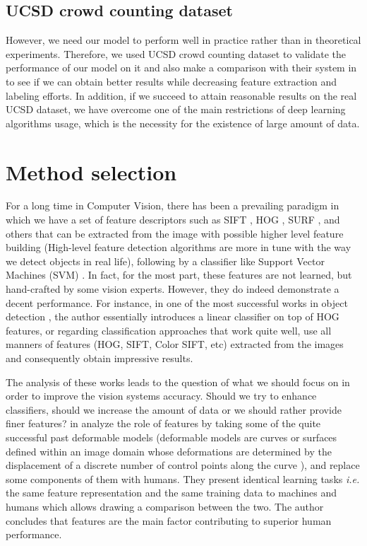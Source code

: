 \subsection{UCSD crowd counting dataset}

However, we need our model to perform well in practice rather than in theoretical experiments. Therefore, we used UCSD crowd counting dataset \cite{chan2008privacy} to validate the performance of our model on it and also make a comparison with their system in \cite{chan2008privacy} to see if we can obtain better results while decreasing feature extraction and labeling efforts. In addition, if we succeed to attain reasonable results on the real UCSD dataset, we have overcome one of the main restrictions of deep learning algorithms usage, which is the necessity for the existence of large amount of data.     


\section{Method selection}

For a long time in Computer Vision, there has been a prevailing paradigm in which we have a set of feature descriptors such as SIFT \cite{lowe1999object}, HOG \cite{dalal2005histograms}, SURF \cite{bay2006surf}, and others that can be extracted from the image with possible higher level feature building (High-level feature detection algorithms are more in tune with the way we detect objects in real life), following by a classifier like Support Vector Machines (SVM) \cite{vapnik1964note, boser1992training}. In fact, for the most part, these features are not learned, but hand-crafted by some vision experts. However, they do indeed demonstrate a decent performance. For instance, in one of the most successful works in object detection \cite{felzenszwalb2010object}, the author essentially introduces a linear classifier on top of HOG features, or regarding classification approaches that work quite well, \citeauthor{yu2010object} use all manners of features (HOG, SIFT, Color SIFT, etc) extracted from the images and consequently obtain impressive results. 

\indent The analysis of these works leads to the question of what we should focus on in order to improve the vision systems accuracy. Should we try to enhance classifiers, should we increase the amount of data or we should rather provide finer features? \citeauthor*{parikh2010role} in \cite{parikh2010role} analyze the role of features by taking some of the quite successful past deformable models \cite{albrecht2015deformable} (deformable models are curves or surfaces defined within an image domain whose deformations are determined by the displacement of a discrete number of control points along the curve \cite{xu2000image}), and replace some components of them with humans. They present identical learning tasks \textit{i.e.} the same feature representation and the same training data to machines and humans which allows drawing a comparison between the two. The author concludes that features are the main factor contributing to superior human performance.

